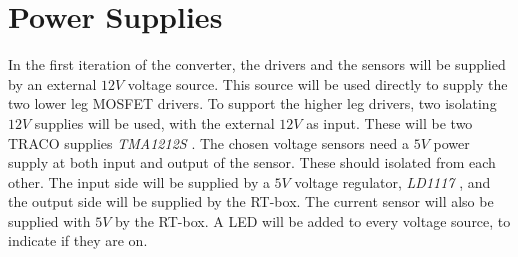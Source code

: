 \section{Power Supplies}\label{power_supplies}
In the first iteration of the converter, the drivers and the sensors will be supplied by an external $12V$ voltage source. This source will be used directly to supply the two lower leg MOSFET drivers. To support the higher leg drivers, two isolating $12V$ supplies will be used, with the external $12V$ as input. These will be two TRACO supplies \textit{TMA1212S} \cite{traco_tma1212}. The chosen voltage sensors need a $5V$ power supply at both input and output of the sensor. These should isolated from each other. The input side will be supplied by a $5V$ voltage regulator, \textit{LD1117} \cite{LD1117}, and the output side will be supplied by the RT-box. The current sensor will also be supplied with $5V$ by the RT-box. A LED will be added to every voltage source, to indicate if they are on.